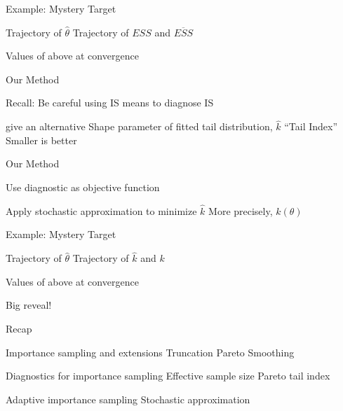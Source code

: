 \documentclass[14pt]{beamer}
\begin{document}
\begin{frame}{Example: Mystery Target}
    \begin{outline}
        \1 Trajectory of $\hat{\theta}$
        \1 Trajectory of $ESS$ and $\overline{ESS}$ \newline

        \1 Values of above at convergence
    \end{outline}
\end{frame}

\begin{frame}{Our Method}
    \begin{outline}
        \1 Recall: Be careful using IS means to diagnose IS \newline
        
        \1 \citeauthor{Veh22} give an alternative
            \2 Shape parameter of fitted tail distribution, $\hat{k}$
            \2 ``Tail Index''
            \2 Smaller is better
    \end{outline}
\end{frame}

\begin{frame}{Our Method}
    \begin{outline}
        \1 Use diagnostic as objective function \newline

        \1 Apply stochastic approximation to minimize $\hat{k}$
            \2 More precisely, $k(\theta)$
    \end{outline}
\end{frame}

\begin{frame}{Example: Mystery Target}
    \begin{outline}
        \1 Trajectory of $\hat{\theta}$
        \1 Trajectory of $\hat{k}$ and $k$ \newline

        \1 Values of above at convergence \newline

        \1 Big reveal!
    \end{outline}
\end{frame}

\begin{frame}{Recap}
    \begin{outline}
        \1 Importance sampling and extensions
            \2 Truncation
            \2 Pareto Smoothing \newline
        
        \1 Diagnostics for importance sampling
            \2 Effective sample size
            \2 Pareto tail index \newline

        \1 Adaptive importance sampling
            \2 Stochastic approximation
    \end{outline}
\end{frame}
\end{document}
